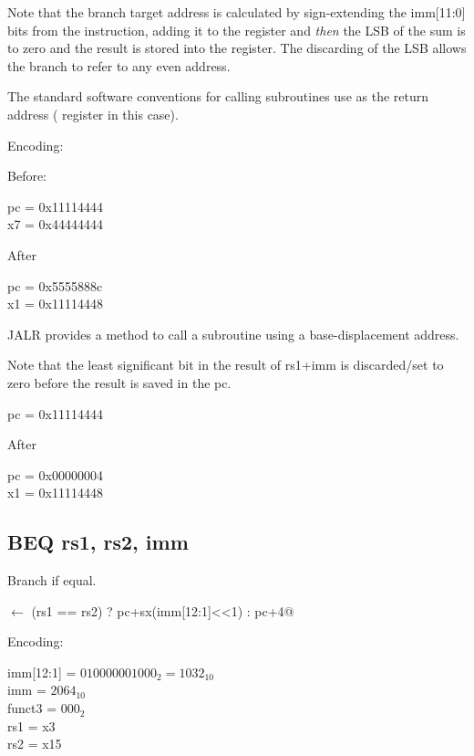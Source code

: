 Note that the branch target address is calculated by 
sign-extending the imm[11:0] bits from the instruction, 
adding it to the  register and {\em then} the 
LSB of the sum is to zero and the result is stored into the 
 register.
The discarding of the LSB allows the branch to refer to any 
even address.

The standard software conventions for calling subroutines
use  as the return address ( register in this 
case).~\cite[p.~16]{rvismv1v22:2017}


Encoding:


Before:

pc = 0x11114444\\
x7 = 0x44444444

After

pc = 0x5555888c\\
x1 = 0x11114448

JALR provides a method to call a subroutine using a base-displacement address.


Note that the least significant bit in the result of rs1+imm is 
discarded/set to zero before the result is saved in the pc.
 
pc = 0x11114444

After

pc = 0x00000004\\
x1 = 0x11114448



\subsection{BEQ rs1, rs2, imm}

Branch if equal.

\verb@pc@ $\leftarrow$ \verb@(rs1 == rs2) ? pc+sx(imm[12:1]<<1) : pc+4@

Encoding:


imm[12:1] = $010000001000_2 = 1032_{10}$\\
imm = $2064_{10}$\\
funct3 = $000_2$\\
rs1 = x3\\
rs2 = x15



